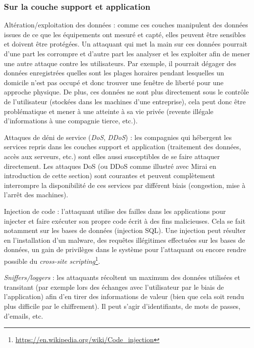 \documentclass[]{article}
\begin{document}
\subsubsection{Sur la couche support et application}

\par Altération/exploitation des données : comme ces couches manipulent des données issues de ce que les équipements ont mesuré et capté, elles peuvent être sensibles et doivent être protégées. Un attaquant qui met la main sur ces données pourrait d'une part les corrompre et d'autre part les analyser et les exploiter afin de mener une autre attaque contre les utilisateurs. Par exemple, il pourrait dégager des données enregistrées quelles sont les plages horaires pendant lesquelles un domicile n'est pas occupé et donc trouver une fenêtre de liberté pour une approche physique. De plus,  ces données ne sont plus directement sous le contrôle de l'utilisateur (stockées dans les machines d'une entreprise), cela peut donc être problématique et mener à une atteinte à sa vie privée (revente  illégale d'informations à une compagnie tierce, etc.).\\

\par Attaques de déni de service (\textit{DoS}, \textit{DDoS}) : les compagnies qui hébergent les services repris dans les couches support et application (traitement des données, accès aux serveurs, etc.) sont elles aussi susceptibles de se faire attaquer directement. Les attaques DoS (ou DDoS comme illustré avec Mirai en introduction de cette section) sont courantes et peuvent complètement interrompre la disponibilité de ces services par différent biais (congestion, mise à l'arrêt des machines).\\

\par Injection de code : l'attaquant utilise des failles dans les applications pour injecter et faire exécuter son propre code écrit à des fins malicieuses. Cela se fait notamment sur les bases de données (injection SQL). Une injection peut résulter en l'installation d'un malware, des requêtes illégitimes effectuées sur les bases de données, un gain de privilèges dans le système pour l'attaquant ou encore rendre possible du \textit{cross-site scripting}\footnote{\url{https://en.wikipedia.org/wiki/Code_injection}}.\\

\par \textit{Sniffers/loggers} : les attaquants récoltent un maximum des données utilisées et transitant (par exemple lors des échanges avec l'utilisateur par le biais de l'application) afin d'en tirer des informations de valeur (bien que cela soit rendu plus difficile par le chiffrement). Il peut s'agir d'identifiants, de mots de passes, d'emails, etc.\\
\end{document}
